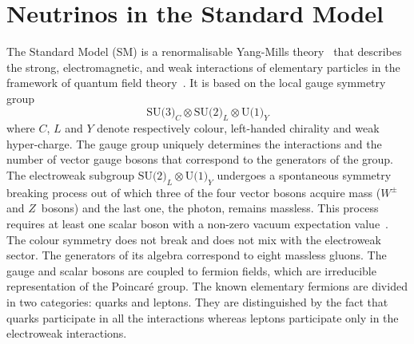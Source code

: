 
\clearpage
\chapter{Neutrinos in the Standard Model}
\label{cha:intro}

The Standard Model (SM) is a renormalisable Yang-Mills theory~\cite{Yang:1954ek} that describes the strong, %
electromagnetic, and weak interactions of elementary particles in the framework of quantum field %
theory~\cite{Glashow:1961tr, Weinberg:1967tq, Salam:1968rm}.
It is based on the local gauge symmetry group 
\begin{equation}
	\label{eq:smgroup}
	\text{SU(3)}_C \otimes \text{SU(2)}_L \otimes \text{U(1)}_Y
\end{equation}
where $C$, $L$ and $Y$ denote respectively colour, left-handed chirality and weak hyper-charge.
The gauge group uniquely determines the interactions and the number of %
vector gauge bosons that correspond to the generators of the group.
%
The electroweak subgroup $\text{SU(2)}_L \otimes \text{U(1)}_Y$ undergoes a spontaneous symmetry breaking process %
out of which three of the four vector bosons acquire mass ($W^\pm$ and $Z$~bosons) and the last one, the photon, remains massless.
This process requires at least one scalar boson with a non-zero vacuum expectation value~\cite{Higgs:1964pj, Higgs:1964ia}.
The colour symmetry does not break and does not mix with the electroweak sector. 
The generators of its algebra correspond to eight massless gluons.
The gauge and scalar bosons are coupled to fermion fields, which are irreducible representation of %
the Poincaré group.
The known elementary fermions are divided in two categories: quarks and leptons.
They are distinguished by the fact that quarks participate in all the interactions %
whereas leptons participate only in the electroweak interactions.
